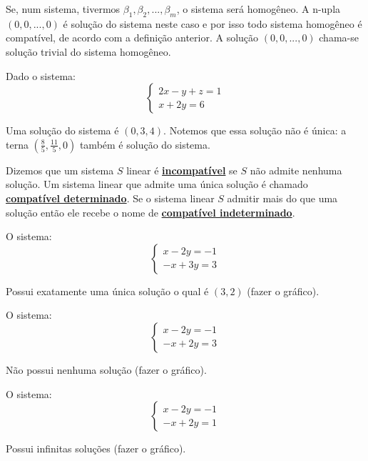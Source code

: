 Se, num sistema, tivermos $\beta_{1},\beta_{2},...,\beta_{m}$, o sistema será homogêneo. A n-upla $(0,0,...,0)$ é solução do sistema neste caso e por isso todo sistema homogêneo é compatível, de acordo com a definição anterior. A solução $(0,0,...,0)$ chama-se solução trivial do sistema homogêneo. 
\begin{ex}
	Dado o sistema:\\
	\begin{equation*}
	\begin{cases}
	2x-y+z=1 \\
    x+2y=6 
	\end{cases}
	\end{equation*}
\end{ex}
Uma solução do sistema é $(0,3,4)$. Notemos que essa solução não é única: a terna $(\frac{8}{5},\frac{11}{5},0)$ também é solução do sistema.

\begin{df}
	Dizemos que um sistema $S$ linear é \underline{\textbf{incompatível}} se $S$ não admite nenhuma solução. Um sistema linear que admite uma única solução é chamado \underline{\textbf{compatível determinado}}. Se o sistema linear $S$ admitir mais do que uma solução então ele recebe o nome de \underline{\textbf{compatível indeterminado}}. 	
\end{df}
\begin{ex}
	O sistema:\\
	\begin{equation*}
	\begin{cases}
	x-2y=-1 \\
	-x+3y=3
	\end{cases}
	\end{equation*} 
\end{ex}
Possui exatamente uma única solução o qual é  $(3,2)$ (fazer o gráfico).
\begin{ex}
	O sistema:\\
	\begin{equation*}
	\begin{cases}
	x-2y=-1 \\
	-x+2y=3
	\end{cases}
	\end{equation*} 
\end{ex}
Não possui nenhuma solução (fazer o gráfico).
\begin{ex}
	O sistema:\\
	\begin{equation*}
	\begin{cases}
	x-2y=-1 \\
	-x+2y=1
	\end{cases}
	\end{equation*} 
\end{ex}
Possui infinitas soluções (fazer o gráfico).

